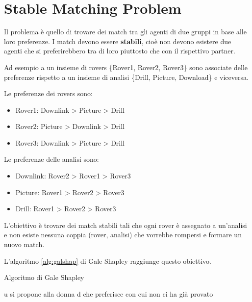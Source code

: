 \newpage

\section{Stable Matching Problem}


Il problema è quello di trovare dei match tra gli agenti di due gruppi
in base alle loro preferenze. I match devono essere \textbf{stabili}, cioè
non devono esistere due agenti che si preferirebbero tra di loro piuttosto
che con il rispettivo partner.

Ad esempio a un insieme di rovers \{Rover1, Rover2, Rover3\} sono associate
delle preferenze rispetto a un insieme di analisi \{Drill, Picture, Download\}
e viceversa.

Le preferenze dei rovers sono:

\begin{itemize}
 \item Rover1:  Downlink > Picture > Drill
 \item Rover2:  Picture > Downlink > Drill
 \item Rover3:  Downlink > Picture > Drill
\end{itemize}

Le preferenze delle analisi sono:

\begin{itemize}
 \item Downlink: Rover2 > Rover1 > Rover3
 \item Picture: Rover1 > Rover2 > Rover3
 \item Drill: Rover1 > Rover2 > Rover3
\end{itemize}

L'obiettivo è trovare dei match stabili tali che ogni rover è assegnato a
un'analisi e non esiste nessuna coppia (rover, analisi) che vorrebbe rompersi
e formare un nuovo match.

L'algoritmo \ref{alg:galshap} di Gale Shapley raggiunge questo obiettivo.

\begin{algorithm}
    \caption{Algoritmo di Gale Shapley}
    \label{alg:galshap}
    \begin{algorithmic}[1]
            \State u si propone alla donna d che preferisce con cui non ci
ha già provato
             
            \Else
             
            \Else {} \EndIf
            \EndIf
            \EndWhile
        \EndProcedure
    \end{algorithmic}
\end{algorithm}

